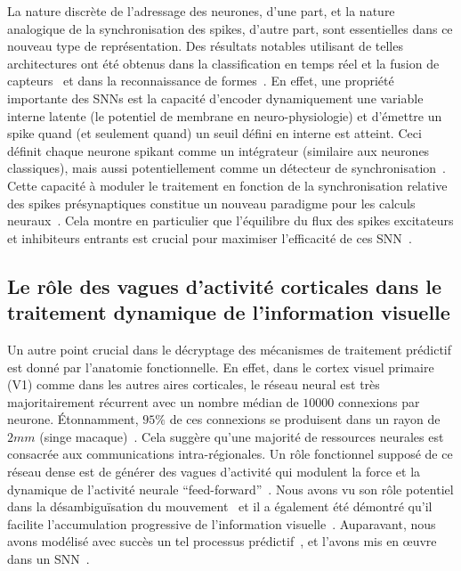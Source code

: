 \documentclass[11pt,french,a4paper,oneside]{article}%
\begin{document}
La nature discrète de l'adressage des neurones, d'une part, et la nature
analogique de la synchronisation des spikes, d'autre part, sont
essentielles dans ce nouveau type de représentation. Des résultats
notables utilisant de telles architectures ont été obtenus dans la
classification en temps réel et la fusion de capteurs~\citep{Oconnor13} et dans la reconnaissance de formes~\citep{Lagorce17}. En
effet, une propriété importante des SNNs est la capacité d'encoder
dynamiquement une variable interne latente (le potentiel de membrane en
neuro-physiologie) et d'émettre un spike quand (et seulement quand) un
seuil défini en interne est atteint. Ceci définit chaque neurone spikant
comme un intégrateur (similaire aux neurones classiques), mais aussi
potentiellement comme un détecteur de synchronisation~\citep{Perrinet02}.
Cette capacité à moduler le traitement en fonction de la synchronisation
relative des spikes présynaptiques constitue un nouveau paradigme pour les
calculs neuraux~\citep{Paugam12}. Cela montre en
particulier que l'équilibre du flux des spikes excitateurs et inhibiteurs
entrants est crucial pour maximiser l'efficacité de ces SNN~\citep{Hansel12}.

\subsection{Le rôle des vagues d'activité corticales dans le traitement
dynamique de l'information
visuelle}
Un autre point crucial dans le décryptage des mécanismes de traitement
prédictif est donné par l'anatomie fonctionnelle. En effet, dans le
cortex visuel primaire (V1) comme dans les autres aires corticales, le
réseau neural est très majoritairement récurrent avec un nombre médian de $10000$
connexions par neurone. Étonnamment, $95 \%$ de ces connexions se
produisent dans un rayon de $2 mm$ (singe macaque)~\citep{Markov13}.
Cela suggère qu'une majorité de ressources neurales est consacrée aux
communications intra-régionales. Un rôle fonctionnel supposé de ce
réseau dense est de générer des vagues d'activité qui modulent la force
et la dynamique de l'activité neurale ``feed-forward''~\citep{Muller18}. Nous avons vu son rôle potentiel dans la désambiguïsation du
mouvement~\citep{Chemla19} et il a également été démontré qu'il
facilite l'accumulation progressive de l'information visuelle~\citep{Bringuier99}. Auparavant, nous avons modélisé avec succès un tel
processus prédictif~\citep{Perrinet12pred,Khoei13jpp,KhoeiMassonPerrinet17}, et l'avons mis en œuvre dans un SNN~\citep{Kaplan13}.
\end{document}
